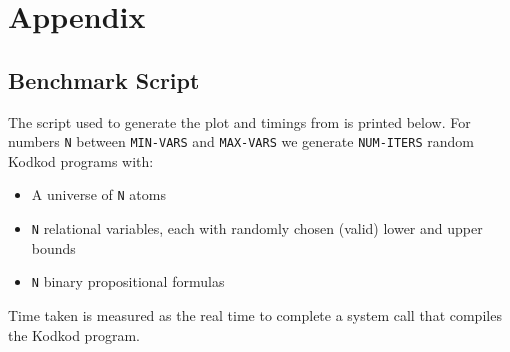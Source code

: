 \section{Appendix}
\label{sec:appendix}

\subsection{Benchmark Script}

The script used to generate the plot and timings from  is printed below.
For numbers {\tt N} between {\tt MIN-VARS} and {\tt MAX-VARS} we generate {\tt NUM-ITERS}
 random Kodkod programs with:
\begin{itemize}
\item A universe of {\tt N} atoms
\item {\tt N} relational variables, each with randomly chosen (valid) lower and upper bounds
\item {\tt N} binary propositional formulas
\end{itemize}

Time taken is measured as the real time to complete a system call that compiles
 the Kodkod program.


